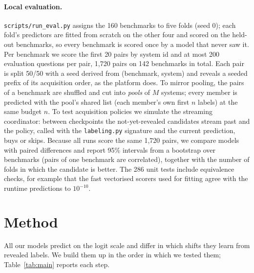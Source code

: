 \documentclass{article}
\newcommand{\code}[1]{\texttt{#1}}
\begin{document}
\paragraph{Local evaluation.} \code{scripts/run\_eval.py} assigns the 160 benchmarks to five folds (seed 0); each fold's predictors are fitted from scratch on the other four and scored on the held-out benchmarks, so every benchmark is scored once by a model that never saw it. Per benchmark we score the first 20 pairs by system id and at most 200 evaluation questions per pair, 1{,}720 pairs on 142 benchmarks in total. Each pair is split 50/50 with a seed derived from (benchmark, system) and reveals a seeded prefix of its acquisition order, as the platform does. To mirror pooling, the pairs of a benchmark are shuffled and cut into \emph{pools} of $M$ systems; every member is predicted with the pool's shared list (each member's own first $n$ labels) at the same budget $n$. To test acquisition policies we simulate the streaming coordinator: between checkpoints the not-yet-revealed candidates stream past and the policy, called with the \code{labeling.py} signature and the current prediction, buys or skips. Because all runs score the same 1{,}720 pairs, we compare models with paired differences and report 95\% intervals from a bootstrap over benchmarks (pairs of one benchmark are correlated), together with the number of folds in which the candidate is better. The 286 unit tests include equivalence checks, for example that the fast vectorised scorers used for fitting agree with the runtime predictions to $10^{-10}$.

\section{Method}
\label{sec:method}

All our models predict on the logit scale and differ in which shifts they learn from revealed labels. We build them up in the order in which we tested them; Table~\ref{tab:main} reports each step.
\end{document}
